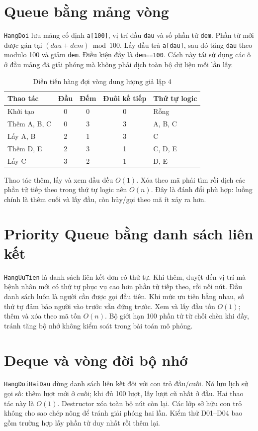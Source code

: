 \documentclass[12pt,a4paper,oneside]{report}
\begin{document}
\section{Queue bằng mảng vòng}
\texttt{HangDoi} lưu mảng cố định \texttt{a[100]}, vị trí đầu \texttt{dau} và số phần tử \texttt{dem}. Phần tử mới được gán tại $(dau+dem)\bmod 100$. Lấy đầu trả \texttt{a[dau]}, sau đó tăng \texttt{dau} theo modulo 100 và giảm \texttt{dem}. Điều kiện đầy là \texttt{dem==100}. Cách này tái sử dụng các ô ở đầu mảng đã giải phóng mà không phải dịch toàn bộ dữ liệu mỗi lần lấy.

\begin{table}[H]\centering\caption{Diễn tiến hàng đợi vòng dung lượng giả lập 4}
\begin{tabular}{p{3.2cm}ccc p{4.2cm}}\toprule
Thao tác & Đầu & Đếm & Đuôi kế tiếp & Thứ tự logic\\\midrule
Khởi tạo & 0 & 0 & 0 & Rỗng\\
Thêm A, B, C & 0 & 3 & 3 & A, B, C\\
Lấy A, B & 2 & 1 & 3 & C\\
Thêm D, E & 2 & 3 & 1 & C, D, E\\
Lấy C & 3 & 2 & 1 & D, E\\\bottomrule
\end{tabular}
\end{table}

Thao tác thêm, lấy và xem đầu đều $O(1)$. Xóa theo mã phải tìm rồi dịch các phần tử tiếp theo trong thứ tự logic nên $O(n)$. Đây là đánh đổi phù hợp: luồng chính là thêm cuối và lấy đầu, còn hủy/gọi theo mã ít xảy ra hơn.

\section{Priority Queue bằng danh sách liên kết}
\texttt{HangUuTien} là danh sách liên kết đơn có thứ tự. Khi thêm, duyệt đến vị trí mà bệnh nhân mới có thứ tự phục vụ cao hơn phần tử tiếp theo, rồi nối nút. Đầu danh sách luôn là người cần được gọi đầu tiên. Khi mức ưu tiên bằng nhau, số thứ tự đảm bảo người vào trước vẫn đứng trước. Xem và lấy đầu tốn $O(1)$; thêm và xóa theo mã tốn $O(n)$. Bộ giới hạn 100 phần tử từ chối chèn khi đầy, tránh tăng bộ nhớ không kiểm soát trong bài toán mô phỏng.

\section{Deque và vòng đời bộ nhớ}
\texttt{HangDoiHaiDau} dùng danh sách liên kết đôi với con trỏ đầu/cuối. Nó lưu lịch sử gọi số: thêm lượt mới ở cuối; khi đủ 100 lượt, lấy lượt cũ nhất ở đầu. Hai thao tác này là $O(1)$. Destructor xóa toàn bộ nút còn lại. Các lớp sở hữu con trỏ không cho sao chép nông để tránh giải phóng hai lần. Kiểm thử D01--D04 bao gồm trường hợp lấy phần tử duy nhất rồi thêm lại.
\end{document}
